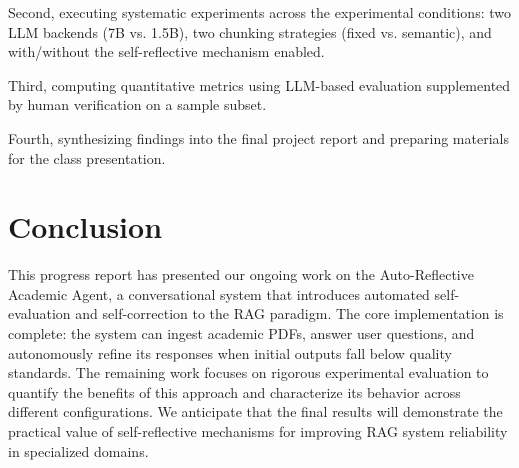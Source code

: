 \documentclass[11pt,a4paper]{article}
\begin{document}
Second, executing systematic experiments across the experimental conditions: two LLM backends (7B vs. 1.5B), two chunking strategies (fixed vs. semantic), and with/without the self-reflective mechanism enabled.

Third, computing quantitative metrics using LLM-based evaluation supplemented by human verification on a sample subset.

Fourth, synthesizing findings into the final project report and preparing materials for the class presentation.

\section{Conclusion}

This progress report has presented our ongoing work on the Auto-Reflective Academic Agent, a conversational system that introduces automated self-evaluation and self-correction to the RAG paradigm. The core implementation is complete: the system can ingest academic PDFs, answer user questions, and autonomously refine its responses when initial outputs fall below quality standards. The remaining work focuses on rigorous experimental evaluation to quantify the benefits of this approach and characterize its behavior across different configurations. We anticipate that the final results will demonstrate the practical value of self-reflective mechanisms for improving RAG system reliability in specialized domains.
\end{document}
